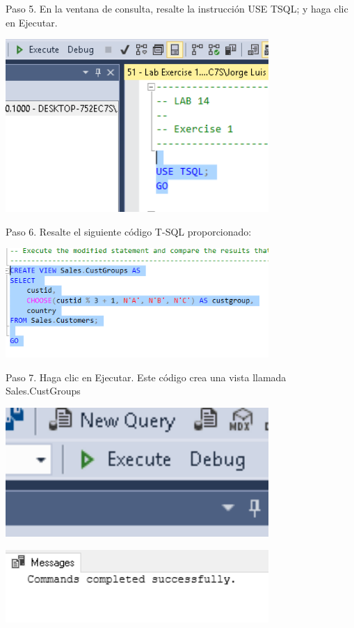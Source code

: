 \begin{flushleft}
\textbf{}\\
\textbf{}\\
Paso 5. En la ventana de consulta, resalte la instrucción USE TSQL; y haga clic en Ejecutar.
\begin{center}
	\includegraphics[width=10cm]{./Imagenes/img5} 
	\end{center}

Paso 6. Resalte el siguiente código T-SQL proporcionado:

\begin{center}
	\includegraphics[width=10cm]{./Imagenes/img6} 
	\end{center}

Paso 7. Haga clic en Ejecutar. Este código crea una vista llamada Sales.CustGroups
\begin{center}
	\includegraphics[width=10cm]{./Imagenes/img7} 
	\end{center}
\begin{center}
	\includegraphics[width=10cm]{./Imagenes/img71} 
	\end{center}


\end{flushleft}
